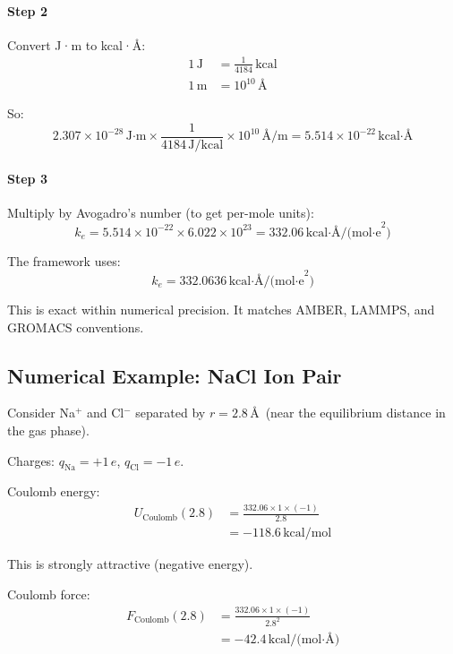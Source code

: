 \documentclass[11pt]{article}
\begin{document}
\paragraph{Step 2} Convert J·m to kcal·\AA:
\begin{align}
1\,\text{J} &= \frac{1}{4184}\,\text{kcal} \\
1\,\text{m} &= 10^{10}\,\text{\AA}
\end{align}

So:
\begin{equation}
2.307 \times 10^{-28}\,\text{J·m} \times \frac{1}{4184\,\text{J/kcal}} \times 10^{10}\,\text{\AA/m} = 5.514 \times 10^{-22}\,\text{kcal·\AA}
\end{equation}

\paragraph{Step 3} Multiply by Avogadro's number (to get per-mole units):
\begin{equation}
k_e = 5.514 \times 10^{-22} \times 6.022 \times 10^{23} = 332.06\,\text{kcal·\AA/(mol·e}^2\text{)}
\end{equation}

The framework uses:
\begin{equation}
\boxed{k_e = 332.0636\,\text{kcal·\AA/(mol·e}^2\text{)}}
\end{equation}

This is exact within numerical precision. It matches AMBER, LAMMPS, and GROMACS conventions.

\subsection{Numerical Example: NaCl Ion Pair}

Consider Na$^+$ and Cl$^-$ separated by $r = 2.8$\,\AA\ (near the equilibrium distance in the gas phase).

Charges: $q_{\text{Na}} = +1\,e$, $q_{\text{Cl}} = -1\,e$.

Coulomb energy:
\begin{align}
U_{\text{Coulomb}}(2.8) &= \frac{332.06 \times 1 \times (-1)}{2.8} \\
&= -118.6\,\text{kcal/mol}
\end{align}

This is strongly attractive (negative energy).

Coulomb force:
\begin{align}
F_{\text{Coulomb}}(2.8) &= \frac{332.06 \times 1 \times (-1)}{2.8^2} \\
&= -42.4\,\text{kcal/(mol·\AA)}
\end{align}
\end{document}
